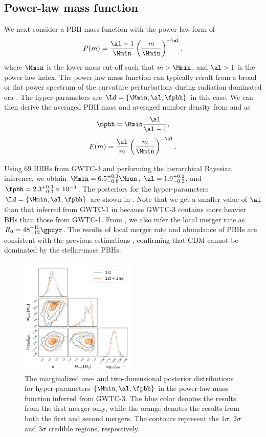 \documentclass[twocolumn]{aastex631}
\def\({\left(}
\def\){\right)}
\def\e{\begin{equation}}
\def\q{\end{equation}}
\begin{document}
\subsection{Power-law mass function}
We next consider a PBH mass function with the power-law form \citep{Carr:1975qj} of
\e\label{power} 
    P(m) = \frac{\al-1}{\Mmin} \(\frac{m}{\Mmin}\)^{-\al},
\q
where $\Mmin$ is the lower-mass cut-off such that $m>\Mmin$, and $\al>1$ is the power-law index. 
The power-law mass function can typically result from a broad or flat power spectrum of the curvature perturbations \citep{DeLuca:2020ioi} during radiation dominated era \citep{Carr:2016drx,Carr:2017jsz}.
The hyper-parameters are $\Ld = \{\Mmin, \al, \fpbh\}$ in this case. 
We can then derive the averaged PBH mass and averaged number density from  and  as
\e
    \mpbh = \Mmin \frac{\al}{\al-1},
\q
\e 
    F(m) = \frac{\al}{m} \(\frac{m}{\Mmin}\)^{-\al}.
\q

Using $69$ BBHs from GWTC-3 and performing the hierarchical Bayesian inference, we obtain $\Mmin = 6.5^{+0.3}_{-0.8} \Msun$, $\al = 1.9^{+0.2}_{-0.2}$, and $\fpbh = 2.3^{+0.3}_{-0.3} \times 10^{-3}$. The posteriors for the hyper-parameters $\Ld = \{\Mmin, \al, \fpbh\}$ are shown in . Note that we get a smaller value of $\al$ than that inferred from GWTC-1 in \cite{Wu:2020drm} because GWTC-3 contains more heavier BHs than those from GWTC-1. From , we also infer the local merger rate as $R_0 = 48^{+15}_{-12} \gpcyr$. The results of local merger rate and abundance of PBHs are consistent with the previous estimations \citep{Chen:2018czv,Chen:2018rzo,Chen:2019irf,Wu:2020drm,Chen:2021nxo,Chen:2022fda}, confirming that CDM cannot be dominated by the stellar-mass PBHs.

\begin{figure}[tbp!]
	\centering
	\includegraphics[width=0.5\textwidth]{post-power.pdf}
	\caption{\label{posterior-power}The marginalized one- and two-dimensional posterior distributions for hyper-parameters $\{\Mmin, \al, \fpbh\}$ in the power-law mass function inferred from GWTC-3. The blue color denotes the results from the first merger only, while the orange denotes the results from both the first and second mergers. The contours represent the $1\sigma$, $2\sigma$ and $3\sigma$ credible regions, respectively.}
\end{figure}
\end{document}
